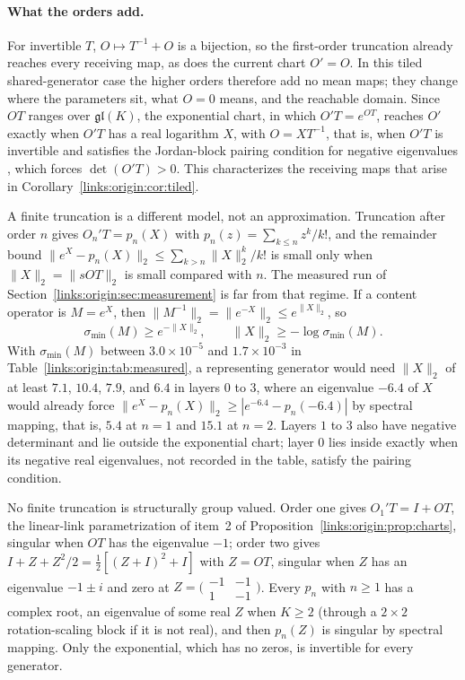 \documentclass[11pt]{article}
\theoremstyle{definition}
\theoremstyle{remark}
\providecommand{\gl}{\mathfrak{gl}}
\begin{document}
\paragraph{What the orders add.}
For invertible $T$, $O\mapsto T^{-1}+O$ is a bijection, so the first-order truncation already reaches every receiving map, as does the current chart $O'=O$. In this tiled shared-generator case the higher orders therefore add no mean maps; they change where the parameters sit, what $O=0$ means, and the reachable domain. Since $OT$ ranges over $\gl(K)$, the exponential chart, in which $O'T=e^{OT}$, reaches $O'$ exactly when $O'T$ has a real logarithm $X$, with $O=XT^{-1}$, that is, when $O'T$ is invertible and satisfies the Jordan-block pairing condition for negative eigenvalues \cite{frame:Culver1966}, which forces $\det(O'T)>0$. This characterizes the receiving maps that arise in Corollary~\ref{links:origin:cor:tiled}.

A finite truncation is a different model, not an approximation. Truncation after order $n$ gives $O_n'T=p_n(X)$ with $p_n(z)=\sum_{k\le n}z^k/k!$, and the remainder bound $\|e^X-p_n(X)\|_2\le\sum_{k>n}\|X\|_2^k/k!$ is small only when $\|X\|_2=\|sOT\|_2$ is small compared with $n$. The measured run of Section~\ref{links:origin:sec:measurement} is far from that regime. If a content operator is $M=e^X$, then $\|M^{-1}\|_2=\|e^{-X}\|_2\le e^{\|X\|_2}$, so
\begin{equation}
\sigma_{\min}(M)\ge e^{-\|X\|_2},\qquad \|X\|_2\ge-\log\sigma_{\min}(M).
\label{links:origin:eq:generator_bound}
\end{equation}
With $\sigma_{\min}(M)$ between $3.0\times10^{-5}$ and $1.7\times10^{-3}$ in Table~\ref{links:origin:tab:measured}, a representing generator would need $\|X\|_2$ of at least $7.1$, $10.4$, $7.9$, and $6.4$ in layers $0$ to $3$, where an eigenvalue $-6.4$ of $X$ would already force $\|e^X-p_n(X)\|_2\ge|e^{-6.4}-p_n(-6.4)|$ by spectral mapping, that is, $5.4$ at $n=1$ and $15.1$ at $n=2$. Layers $1$ to $3$ also have negative determinant and lie outside the exponential chart; layer $0$ lies inside exactly when its negative real eigenvalues, not recorded in the table, satisfy the pairing condition.

No finite truncation is structurally group valued. Order one gives $O_1'T=I+OT$, the linear-link parametrization of item~2 of Proposition~\ref{links:origin:prop:charts}, singular when $OT$ has the eigenvalue $-1$; order two gives $I+Z+Z^2/2=\tfrac12[(Z+I)^2+I]$ with $Z=OT$, singular when $Z$ has an eigenvalue $-1\pm i$ and zero at $Z=\bigl(\begin{smallmatrix}-1&-1\\1&-1\end{smallmatrix}\bigr)$. Every $p_n$ with $n\ge1$ has a complex root, an eigenvalue of some real $Z$ when $K\ge2$ (through a $2\times2$ rotation-scaling block if it is not real), and then $p_n(Z)$ is singular by spectral mapping. Only the exponential, which has no zeros, is invertible for every generator.
\end{document}
